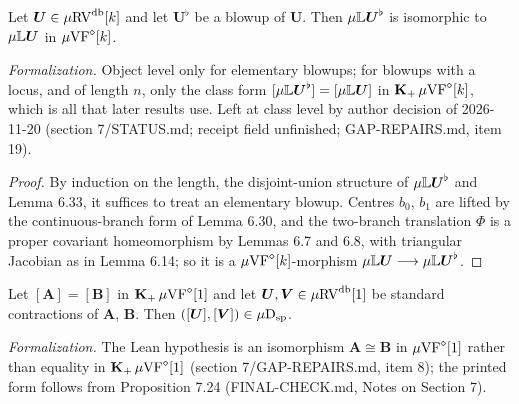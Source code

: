 \setcounter{theorem}{11}
\begin{lemma}
\label{blowup-same-RV-coa}
\leanok
{}
Let $\boldsymbol{U} \in \mu\mathrm{RV}^{\operatorname{db}}[k]$ and let $\boldsymbol{U}^\flat$ be a blowup of $\boldsymbol{U}$. Then $\mu\mathbb{L} \boldsymbol{U}^\flat$ is isomorphic to $\mu\mathbb{L} \boldsymbol{U}$ in $\mu\mathrm{VF}^\diamond[k]$.

\emph{Formalization.} Object level only for elementary blowups; for blowups with a locus, and of length $n$, only the class form $[\mu\mathbb{L} \boldsymbol{U}^\flat] = [\mu\mathbb{L} \boldsymbol{U}]$ in $\operatorname{\mathbf{K}_+} \mu\mathrm{VF}^\diamond[k]$, which is all that later results use. Left at class level by author decision of 2026-11-20 (section 7/STATUS.md; receipt field unfinished; GAP-REPAIRS.md, item 19).
\end{lemma}

\begin{proof}
By induction on the length, the disjoint-union structure of $\mu\mathbb{L} \boldsymbol{U}^\flat$ and Lemma 6.33, it suffices to treat an elementary blowup. Centres $b_0$, $b_1$ are lifted by the continuous-branch form of Lemma 6.30, and the two-branch translation $\Phi$ is a proper covariant homeomorphism by Lemmas 6.7 and 6.8, with triangular Jacobian as in Lemma 6.14; so it is a $\mu\mathrm{VF}^\diamond[k]$-morphism $\mu\mathbb{L} \boldsymbol{U} \longrightarrow \mu\mathbb{L} \boldsymbol{U}^\flat$.
\end{proof}

\setcounter{theorem}{12}
\begin{lemma}
\label{kernel-dim-1-coa}
\leanok
{}
Let $[\boldsymbol{A}] = [\boldsymbol{B}]$ in $\operatorname{\mathbf{K}_+} \mu\mathrm{VF}^\diamond[1]$ and let $\boldsymbol{U}, \boldsymbol{V} \in \mu\mathrm{RV}^{\operatorname{db}}[1]$ be standard contractions of $\boldsymbol{A}$, $\boldsymbol{B}$. Then $([\boldsymbol{U}], [\boldsymbol{V}]) \in \mu\mathrm{D}_{\mathrm{sp}}$.

\emph{Formalization.} The Lean hypothesis is an isomorphism $\boldsymbol{A} \cong \boldsymbol{B}$ in $\mu\mathrm{VF}^\diamond[1]$ rather than equality in $\operatorname{\mathbf{K}_+} \mu\mathrm{VF}^\diamond[1]$ (section 7/GAP-REPAIRS.md, item 8); the printed form follows from Proposition 7.24 (FINAL-CHECK.md, Notes on Section 7).
\end{lemma}

